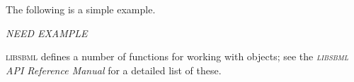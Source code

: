 \documentclass{sbmlmanual}
\newcommand{\libsbml}{\textsc{libsbml}}
\begin{document}
The following is a simple example.  

\emph{NEED EXAMPLE}


\libsbml{} defines a number of functions for working with
 objects; see the \emph{\libsbml{} API Reference Manual}
for a detailed list of these.








\clearpage



\end{document}
